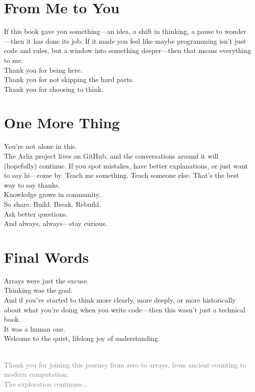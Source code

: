 	\section*{From Me to You}
	If this book gave you something—an idea, a shift in thinking, a pause to wonder—then it has done its job. If it made you feel like maybe programming isn’t just code and rules, but a window into something deeper—then that means everything to me.\\	
	Thank you for being here.\\
	Thank you for not skipping the hard parts.\\
	Thank you for choosing to think.
	\section*{One More Thing}
	You’re not alone in this.\\
	The Arliz project lives on GitHub, and the conversations around it will (hopefully) continue. If you spot mistakes, have better explanations, or just want to say hi—come by. Teach me something. Teach someone else. That’s the best way to say thanks.\\
	Knowledge grows in community.\\
	So share. Build. Break. Rebuild.\\
	Ask better questions.\\
	And always, always—stay curious.\\
	\section*{Final Words}
	Arrays were just the excuse.\\
	Thinking was the goal.\\
	And if you’ve started to think more clearly, more deeply, or more historically about what you’re doing when you write code—then this wasn’t just a technical book.\\
	It was a human one.\\
	Welcome to the quiet, lifelong joy of understanding.\\
	\printindex

\vfill

\begin{center}
	\\[1em]
	\small\textcolor{gray}{Thank you for joining this journey from zero to arrays, from ancient counting to modern computation.\\
		The exploration continues...}
\end{center}